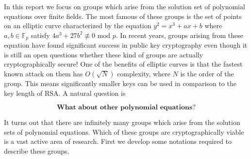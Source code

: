 In this report we focus on groups which arise from the solution set of polynomial equations over finite fields. The most famous of these groups is the set of points on an elliptic curve characterized by the equation $y^2 = x^3 + ax + b$ where $a,b \in \mathbb{F}_p$ satisfy $4a^3 + 27b^2 \not\equiv 0 \text{ mod } p$. In recent years, groups arising from these equation have found significant success in public key cryptography even though it is still an open questions whether these kind of groups are actually cryptographically secure! One of the benefits of elliptic curves is that the fastest known attack on them has $O(\sqrt{N})$ complexity, where $N$ is the order of the group. This means significantly smaller keys can be used in comparison to the key length of RSA. A natural question is 

$$
\textbf{What about other polynomial equations?}
$$ 

It turns out that there are infinitely many groups which arise from the solution sets of polynomial equations. Which of these groups are cryptographically viable is a vast active area of research. First we develop some notations required to describe these groups. \\ 


